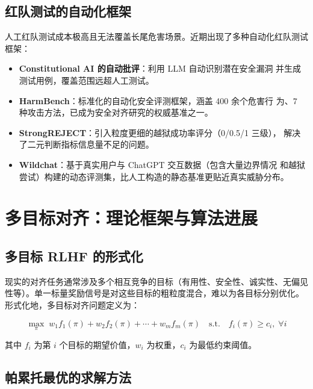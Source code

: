 \documentclass[12pt,a4paper,UTF8]{ctexart}
\begin{document}
\subsection{红队测试的自动化框架}

人工红队测试成本极高且无法覆盖长尾危害场景。近期出现了多种自动化红队测试
框架：
\begin{itemize}[leftmargin=2em]
  \item \textbf{Constitutional AI 的自动批评}：利用 LLM 自动识别潜在安全漏洞
    并生成测试用例，覆盖范围远超人工测试。
  \item \textbf{HarmBench}：标准化的自动化安全评测框架，涵盖 400 余个危害行
    为、7 种攻击方法，已成为安全对齐研究的权威基准之一。
  \item \textbf{StrongREJECT}：引入粒度更细的越狱成功率评分（0/0.5/1 三级），
    解决了二元判断指标信息量不足的问题。
  \item \textbf{Wildchat}：基于真实用户与 ChatGPT 交互数据（包含大量边界情况
    和越狱尝试）构建的动态评测集，比人工构造的静态基准更贴近真实威胁分布。
\end{itemize}

\section{多目标对齐：理论框架与算法进展}
\label{sec:morl}

\subsection{多目标 RLHF 的形式化}

现实的对齐任务通常涉及多个相互竞争的目标（有用性、安全性、诚实性、无偏见
性等）。单一标量奖励信号是对这些目标的粗粒度混合，难以为各目标分别优化。
形式化地，多目标对齐问题定义为：

\begin{equation}
  \max_{\pi}\; w_1 f_1(\pi) + w_2 f_2(\pi) + \cdots + w_m f_m(\pi)
  \quad \text{s.t.} \quad f_i(\pi) \geq c_i,\; \forall i
\end{equation}

其中 $f_i$ 为第 $i$ 个目标的期望价值，$w_i$ 为权重，$c_i$ 为最低约束阈值。

\subsection{帕累托最优的求解方法}
\end{document}
